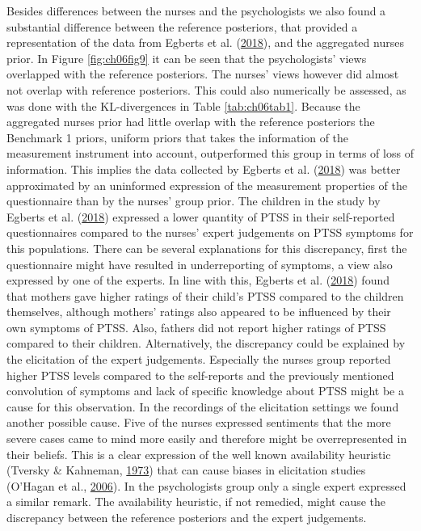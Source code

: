 \documentclass[openright,titlepage,12pt,a4paper]{book}
\begin{document}
Besides differences between the nurses and the psychologists we also found a substantial difference between the reference posteriors, that provided a representation of the data from Egberts et al. (\protect\hyperlink{ref-egberts_mother_2018}{2018}), and the aggregated nurses prior. In Figure \ref{fig:ch06fig9} it can be seen that the psychologists' views overlapped with the reference posteriors. The nurses' views however did almost not overlap with reference posteriors. This could also numerically be assessed, as was done with the KL-divergences in Table \ref{tab:ch06tab1}. Because the aggregated nurses prior had little overlap with the reference posteriors the Benchmark 1 priors, uniform priors that takes the information of the measurement instrument into account, outperformed this group in terms of loss of information. This implies the data collected by Egberts et al. (\protect\hyperlink{ref-egberts_mother_2018}{2018}) was better approximated by an uninformed expression of the measurement properties of the questionnaire than by the nurses' group prior. The children in the study by Egberts et al. (\protect\hyperlink{ref-egberts_mother_2018}{2018}) expressed a lower quantity of PTSS in their self-reported questionnaires compared to the nurses' expert judgements on PTSS symptoms for this populations. There can be several explanations for this discrepancy, first the questionnaire might have resulted in underreporting of symptoms, a view also expressed by one of the experts. In line with this, Egberts et al. (\protect\hyperlink{ref-egberts_mother_2018}{2018}) found that mothers gave higher ratings of their child's PTSS compared to the children themselves, although mothers' ratings also appeared to be influenced by their own symptoms of PTSS. Also, fathers did not report higher ratings of PTSS compared to their children. Alternatively, the discrepancy could be explained by the elicitation of the expert judgements. Especially the nurses group reported higher PTSS levels compared to the self-reports and the previously mentioned convolution of symptoms and lack of specific knowledge about PTSS might be a cause for this observation. In the recordings of the elicitation settings we found another possible cause. Five of the nurses expressed sentiments that the more severe cases came to mind more easily and therefore might be overrepresented in their beliefs. This is a clear expression of the well known availability heuristic (Tversky \& Kahneman, \protect\hyperlink{ref-tversky_availability:_1973}{1973}) that can cause biases in elicitation studies (O'Hagan et al., \protect\hyperlink{ref-ohagan_uncertain_2006}{2006}). In the psychologists group only a single expert expressed a similar remark. The availability heuristic, if not remedied, might cause the discrepancy between the reference posteriors and the expert judgements.
\end{document}
